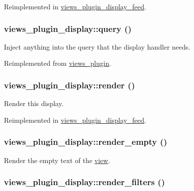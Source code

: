 Reimplemented in \hyperlink{classviews__plugin__display__feed_e5e20d2999e052f50486b5d03b4fb105}{views\_\-plugin\_\-display\_\-feed}.\hypertarget{classviews__plugin__display_efdc473b5cbe1c7eb4d0f5175d02184a}{
\subsubsection[{query}]{\setlength{\rightskip}{0pt plus 5cm}views\_\-plugin\_\-display::query ()}}
\label{classviews__plugin__display_efdc473b5cbe1c7eb4d0f5175d02184a}


Inject anything into the query that the display handler needs. 

Reimplemented from \hyperlink{classviews__plugin_10ac07c47c4a8735786f9fcc38548587}{views\_\-plugin}.\hypertarget{classviews__plugin__display_cf230a4b44b452c9469f5df92e58e32e}{
\subsubsection[{render}]{\setlength{\rightskip}{0pt plus 5cm}views\_\-plugin\_\-display::render ()}}
\label{classviews__plugin__display_cf230a4b44b452c9469f5df92e58e32e}


Render this display. 

Reimplemented in \hyperlink{classviews__plugin__display__feed_661fe08fd1be956d5b5cc40f36daf26b}{views\_\-plugin\_\-display\_\-feed}.\hypertarget{classviews__plugin__display_80f1ef182222a316f4ca38ba1b4e1aa9}{
\subsubsection[{render\_\-empty}]{\setlength{\rightskip}{0pt plus 5cm}views\_\-plugin\_\-display::render\_\-empty ()}}
\label{classviews__plugin__display_80f1ef182222a316f4ca38ba1b4e1aa9}


Render the empty text of the \hyperlink{classview}{view}. \hypertarget{classviews__plugin__display_9bdc16c7066a51729cedb9235bc15e6f}{
\subsubsection[{render\_\-filters}]{\setlength{\rightskip}{0pt plus 5cm}views\_\-plugin\_\-display::render\_\-filters ()}}
\label{classviews__plugin__display_9bdc16c7066a51729cedb9235bc15e6f}


